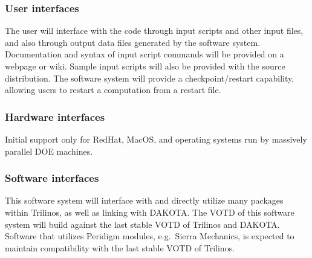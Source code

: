 \documentclass[10pt]{article}
\theoremstyle{plain}
\theoremstyle{definition}
\begin{document}
\subsubsection{User interfaces}

The user will interface with the code through input scripts and other input files, and also through output data files generated by the software system. Documentation and syntax of input script commands will be provided on a webpage or wiki. Sample input scripts will also be provided with the source distribution. The software system will provide a checkpoint/restart capability, allowing users to restart a computation from a restart file.

\subsubsection{Hardware interfaces}

Initial support only for RedHat, MacOS, and operating systems run by massively parallel DOE machines.

\subsubsection{Software interfaces}

This software system will interface with and directly utilize many packages within Trilinos, as well as linking with DAKOTA. The VOTD of this software system will build against the last stable VOTD of Trilinos and DAKOTA.  Software that utilizes Peridigm modules, e.g.~Sierra Mechanics, is expected to maintain compatibility with the last stable VOTD of Trilinos.
\end{document}
